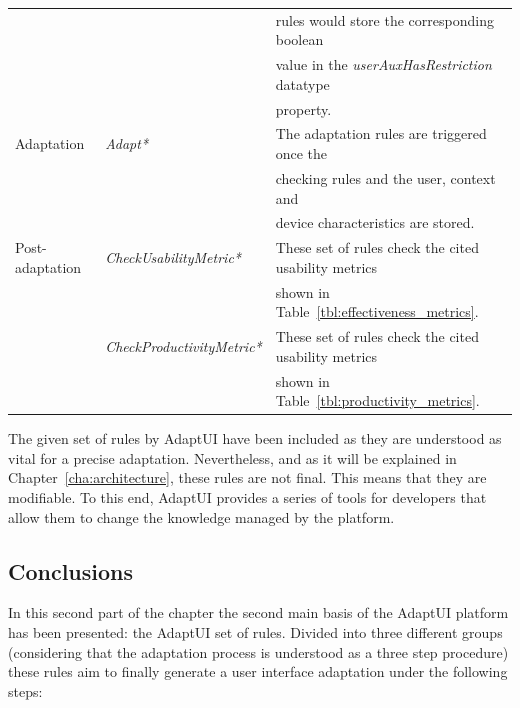 \begin{table}[H]
\begin{tabular}{l l l}
			& 						& rules would store the corresponding boolean 			\\
			&						& value in the \textit{userAuxHasRestriction} datatype 		\\
			&						& property.							\\
  Adaptation		& \textit{Adapt*}				& The adaptation rules are triggered once the 			\\
			&						& checking rules and the user, context and			\\
			&						& device characteristics are stored.				\\
  Post-adaptation	& \textit{CheckUsabilityMetric*}		& These set of rules check the cited usability metrics 		\\
			& 						& shown in Table~\ref{tbl:effectiveness_metrics}.		\\
			& \textit{CheckProductivityMetric*}		& These set of rules check the cited usability metrics 		\\
			&						& shown in Table~\ref{tbl:productivity_metrics}.		\\
  \hline

\end{tabular}
\end{table}


The given set of rules by AdaptUI have been included as they are understood as
vital for a precise adaptation. Nevertheless, and as it will be explained in
Chapter~\ref{cha:architecture}, these rules are not final. This means that they
are modifiable. To this end, AdaptUI provides a series of tools for developers
that allow them to change the knowledge managed by the platform.


\subsection{Conclusions}
\label{sec:rules_conclusions}

In this second part of the chapter the second main basis of the AdaptUI platform
has been presented: the AdaptUI set of rules. Divided into three different groups
(considering that the adaptation process is understood as a three step procedure)
these rules aim to finally generate a user interface adaptation under the following
steps:

